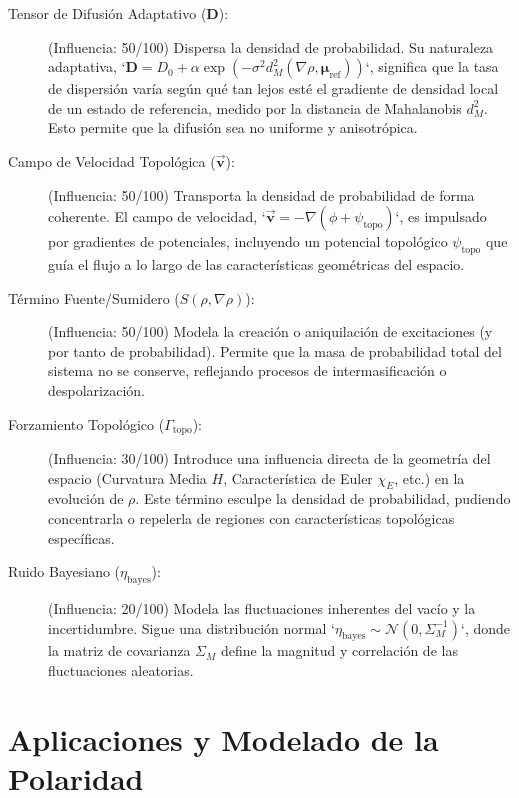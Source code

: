 \documentclass{book} %
\newcommand{\bvec}[1]{\vec{\mathbf{#1}}} %
\begin{document}
\begin{description}
    \item[Tensor de Difusión Adaptativo ($\mathbf{D}$):] (Influencia: 50/100) Dispersa la densidad de probabilidad. Su naturaleza adaptativa, `$\mathbf{D}=D_0+\alpha\exp(-\sigma^2d_M^2(\nabla\rho,\boldsymbol{\mu}_{\text{ref}}))$`, significa que la tasa de dispersión varía según qué tan lejos esté el gradiente de densidad local de un estado de referencia, medido por la distancia de Mahalanobis $d_M^2$. Esto permite que la difusión sea no uniforme y anisotrópica.

    \item[Campo de Velocidad Topológica ($\bvec{v}$):] (Influencia: 50/100) Transporta la densidad de probabilidad de forma coherente. El campo de velocidad, `$\bvec{v}=-\nabla(\phi+\psi_{\text{topo}})$`, es impulsado por gradientes de potenciales, incluyendo un potencial topológico $\psi_{\text{topo}}$ que guía el flujo a lo largo de las características geométricas del espacio.

    \item[Término Fuente/Sumidero ($S(\rho,\nabla\rho)$):] (Influencia: 50/100) Modela la creación o aniquilación de excitaciones (y por tanto de probabilidad). Permite que la masa de probabilidad total del sistema no se conserve, reflejando procesos de intermasificación o despolarización.

    \item[Forzamiento Topológico ($\Gamma_{\text{topo}}$):] (Influencia: 30/100) Introduce una influencia directa de la geometría del espacio (Curvatura Media $H$, Característica de Euler $\chi_E$, etc.) en la evolución de $\rho$. Este término esculpe la densidad de probabilidad, pudiendo concentrarla o repelerla de regiones con características topológicas específicas.

    \item[Ruido Bayesiano ($\eta_{\text{bayes}}$):] (Influencia: 20/100) Modela las fluctuaciones inherentes del vacío y la incertidumbre. Sigue una distribución normal `$\eta_{\text{bayes}}\sim\mathcal{N}(0,\Sigma_M^{-1})$`, donde la matriz de covarianza $\Sigma_M$ define la magnitud y correlación de las fluctuaciones aleatorias.
\end{description}

\chapter{Aplicaciones y Modelado de la Polaridad}
\end{document}
